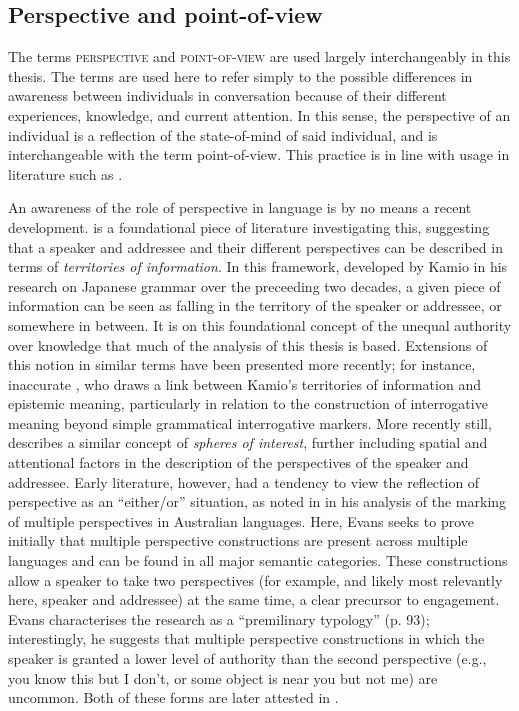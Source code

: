 \subsection{Perspective and point-of-view}\label{ss:Intro:PerspPOVDefs}
The terms \textsc{perspective} and \textsc{point-of-view} are used largely interchangeably in this thesis. The terms are used here to refer simply to the possible differences in awareness between individuals in conversation because of their different experiences, knowledge, and current attention. In this sense, the perspective of an individual is a reflection of the state-of-mind of said individual, and is interchangeable with the term point-of-view. This practice is in line with usage in literature such as . 

An awareness of the role of perspective in language is by no means a recent development.  is a foundational piece of literature investigating this, suggesting that a speaker and addressee and their different perspectives can be described in terms of \textit{territories of information}. In this framework, developed by Kamio in his research on Japanese grammar over the preceeding two decades, a given piece of information can be seen as falling in the territory of the speaker or addressee, or somewhere in between. It is on this foundational concept of the unequal authority over knowledge that much of the analysis of this thesis is based. Extensions of this notion in similar terms have been presented more recently; for instance, inaccurate , who draws a link between Kamio's territories of information and epistemic meaning, particularly in relation to the construction of interrogative meaning beyond simple grammatical interrogative markers. More recently still,  describes a similar concept of \textit{spheres of interest}, further including spatial and attentional factors in the description of the perspectives of the speaker and addressee. Early literature, however, had a tendency to view the reflection of perspective as an ``either/or'' situation, as noted in  in his analysis of the marking of multiple perspectives in Australian languages. Here, Evans seeks to prove initially that multiple perspective constructions are present across multiple languages and can be found in all major semantic categories. These constructions allow a speaker to take two perspectives (for example, and likely most relevantly here, speaker and addressee) at the same time, a clear precursor to engagement. Evans characterises the research as a ``premilinary typology'' (p. 93); interestingly, he suggests that multiple perspective constructions in which the speaker is granted a lower level of authority than the second perspective (e.g., you know this but I don't, or some object is near you but not me) are uncommon. Both of these forms are later attested in . 

